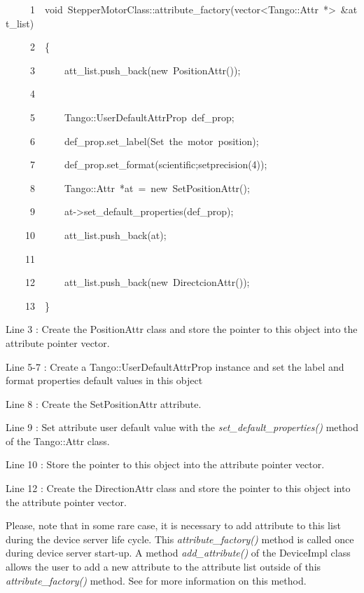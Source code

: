
\begin{lyxcode}
~~~~~1~~void~StepperMotorClass::attribute\_factory(vector<Tango::Attr~{*}>~\&att\_list)

~~~~~2~~\{

~~~~~3~~~~~~att\_list.push\_back(new~PositionAttr());

~~~~~4~~

~~~~~5~~~~~~Tango::UserDefaultAttrProp~def\_prop;

~~~~~6~~~~~~def\_prop.set\_label(\textquotedbl{}Set~the~motor~position\textquotedbl{});

~~~~~7~~~~~~def\_prop.set\_format(\textquotedbl{}scientific;setprecision(4)\textquotedbl{});

~~~~~8~~~~~~Tango::Attr~{*}at~=~new~SetPositionAttr();

~~~~~9~~~~~~at->set\_default\_properties(def\_prop);

~~~~10~~~~~~att\_list.push\_back(at);

~~~~11~~

~~~~12~~~~~~att\_list.push\_back(new~DirectcionAttr());

~~~~13~~\}
\end{lyxcode}


Line 3 : Create the PositionAttr class and store the pointer to this
object into the attribute pointer vector.

Line 5-7 : Create a Tango::UserDefaultAttrProp instance and set the
label and format properties default values in this object

Line 8 : Create the SetPositionAttr attribute. 

Line 9 : Set attribute user default value with the \emph{set\_default\_properties()}
method of the Tango::Attr class.

Line 10 : Store the pointer to this object into the attribute pointer
vector.

Line 12 : Create the DirectionAttr class and store the pointer to
this object into the attribute pointer vector.

Please, note that in some rare case, it is necessary to add attribute
to this list during the device server life cycle. This \emph{attribute\_factory()}
method is called once during device server start-up. A method \emph{add\_attribute()}
of the DeviceImpl class allows the user to add a new attribute to
the attribute list outside of this \emph{attribute\_factory()} method.
See \cite{TANGO_ref_man} for more information on this method.

